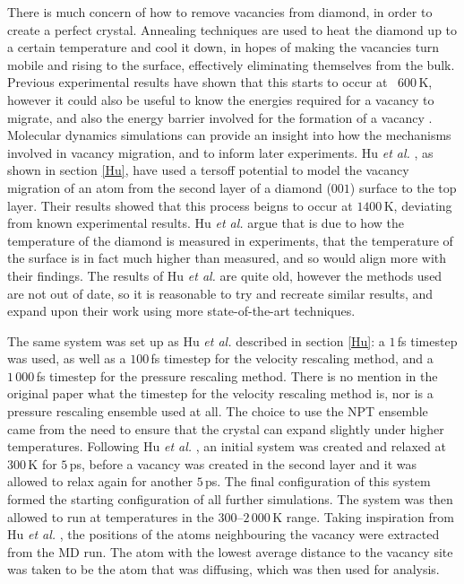 \documentclass[10pt,a4paper,twocolumn,twoside]{extarticle}
\newcommand{\al}{\emph{et al. }}
\begin{document}
There is much concern of how to remove vacancies from diamond, in order to create a perfect crystal. Annealing techniques are used to heat the diamond up to a certain temperature and cool it down, in hopes of making the vacancies turn mobile and rising to the surface, effectively eliminating themselves from the bulk. Previous experimental results have shown that this starts to occur at ~$600$\,K, however it could also be useful to know the energies required for a vacancy to migrate, and also the energy barrier involved for the formation of a vacancy \cite{VacancyTemp}. Molecular dynamics simulations can provide an insight into how the mechanisms involved in vacancy migration, and to inform later experiments. Hu \al, as shown in section \ref{Hu}, have used a tersoff potential to model the vacancy migration of an atom from the second layer of a diamond ($001$) surface to the top layer. Their results showed that this process beigns to occur at $1400$\,K, deviating from known experimental results. Hu \al argue that is due to how the temperature of the diamond is measured in experiments, that the temperature of the surface is in fact much higher than measured, and so would align more with their findings. The results of Hu \al are quite old, however the methods used are not out of date, so it is reasonable to try and recreate similar results, and expand upon their work using more state-of-the-art techniques. 

The same system was set up as Hu \al described in section \ref{Hu}: a $1$\,fs timestep was used, as well as a $100$\,fs timestep for the velocity rescaling method, and a $1\,000$\,fs timestep for the pressure rescaling method. There is no mention in the original paper what the timestep for the velocity rescaling method is, nor is a pressure rescaling ensemble used at all. The choice to use the NPT ensemble came from the need to ensure that the crystal can expand slightly under higher temperatures. Following Hu \al, an initial system was created and relaxed at $300$\,K for $5$\,ps, before a vacancy was created in the second layer and it was allowed to relax again for another $5$\,ps. The final configuration of this system formed the starting configuration of all further simulations. The system was then allowed to run at temperatures in the $300$--$2\,000$\,K range. Taking inspiration from Hu \al, the positions of the atoms neighbouring the vacancy were extracted from the MD run. The atom with the lowest average distance to the vacancy site was taken to be the atom that was diffusing, which was then used for analysis. 
\end{document}
